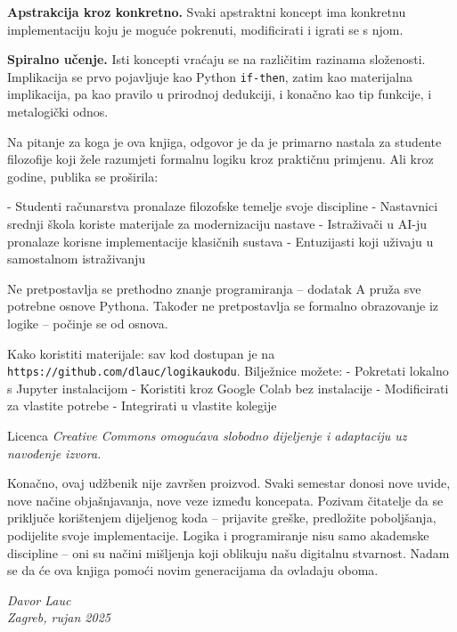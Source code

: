 \textbf{Apstrakcija kroz konkretno.} Svaki apstraktni koncept ima konkretnu implementaciju koju je moguće pokrenuti,
modificirati i igrati se s njom.

\textbf{Spiralno učenje.} Isti koncepti vraćaju se na različitim razinama složenosti. Implikacija se prvo pojavljuje kao Python \texttt{if-then}, zatim kao materijalna implikacija,
pa kao pravilo u prirodnoj dedukciji, i konačno kao tip funkcije, i metalogički odnos.


Na pitanje za koga je ova knjiga, odgovor je da je primarno nastala za studente filozofije koji žele razumjeti formalnu logiku kroz praktičnu primjenu.
Ali kroz godine, publika se proširila:

- Studenti računarstva pronalaze filozofske temelje svoje discipline
- Nastavnici srednji škola koriste materijale za modernizaciju nastave
- Istraživači u AI-ju pronalaze korisne implementacije klasičnih sustava
- Entuzijasti koji uživaju u samostalnom istraživanju

Ne pretpostavlja se prethodno znanje programiranja – dodatak A pruža sve potrebne osnove Pythona.
Također ne pretpostavlja se formalno obrazovanje iz logike – počinje se od osnova.


Kako koristiti materijale: sav kod dostupan je na \texttt{https://github.com/dlauc/logikaukodu}. Bilježnice možete:
- Pokretati lokalno s Jupyter instalacijom
- Koristiti kroz Google Colab bez instalacije
- Modificirati za vlastite potrebe
- Integrirati u vlastite kolegije

Licenca \em{Creative Commons} omogućava slobodno dijeljenje i adaptaciju uz navođenje izvora.


Konačno, ovaj udžbenik nije završen proizvod. Svaki semestar donosi nove uvide, nove načine objašnjavanja,
nove veze između koncepata.
Pozivam čitatelje da se priključe korištenjem dijeljenog koda – prijavite greške, predložite poboljšanja, podijelite svoje implementacije.
Logika i programiranje nisu samo akademske discipline – oni su načini mišljenja koji oblikuju našu digitalnu stvarnost.
Nadam se da će ova knjiga pomoći novim generacijama da ovladaju oboma.

\vspace{1cm}
\begin{flushright}
\textit{Davor Lauc}\\
\textit{Zagreb, rujan 2025}
\end{flushright}
